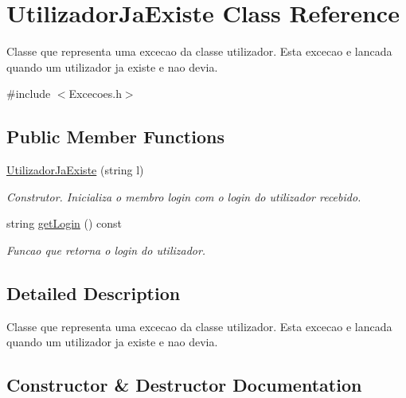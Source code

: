\hypertarget{class_utilizador_ja_existe}{}\section{Utilizador\+Ja\+Existe Class Reference}
\label{class_utilizador_ja_existe}


Classe que representa uma excecao da classe utilizador. Esta excecao e lancada quando um utilizador ja existe e nao devia.  




{\ttfamily \#include $<$Excecoes.\+h$>$}

\subsection*{Public Member Functions}
\begin{DoxyCompactItemize}
\item 
\hyperlink{class_utilizador_ja_existe_af7a157575758e439854a9d7234ae673f}{Utilizador\+Ja\+Existe} (string l)
\begin{DoxyCompactList}\small\item\em Construtor. Inicializa o membro login com o login do utilizador recebido. \end{DoxyCompactList}\item 
string \hyperlink{class_utilizador_ja_existe_a545e95145227b85f40f6342ccbdfcab1}{get\+Login} () const 
\begin{DoxyCompactList}\small\item\em Funcao que retorna o login do utilizador. \end{DoxyCompactList}\end{DoxyCompactItemize}


\subsection{Detailed Description}
Classe que representa uma excecao da classe utilizador. Esta excecao e lancada quando um utilizador ja existe e nao devia. 

\subsection{Constructor \& Destructor Documentation}
\hypertarget{class_utilizador_ja_existe_af7a157575758e439854a9d7234ae673f}{}
